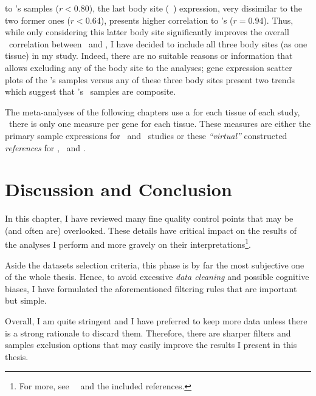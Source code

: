 \begin{itemize}[topsep=0pt,nosep]
            to \uhlen{}'s  samples ($r < 0.80$),
            the last body site (\ie\ ) expression,
            very dissimilar to the two former ones ($r < 0.64$),
            presents higher correlation to \uhlen's ($r = 0.94$).
            Thus, while only considering this latter body site significantly improves
            the overall \oesophagus\ correlation between \gtex\ and \uhlen,
            I have decided to include all three body sites (as one tissue)
            in my study.
            Indeed, there are no suitable reasons or information that allows excluding
            any of the body site  to the analyses;
            gene expression scatter plots of the \uhlen{}'s samples versus
            any of these three body sites present two trends which suggest that
            \uhlen{}'s \oesophagus\ samples are composite.

\end{itemize}

The meta-analyses of the following chapters use
a  for each tissue of each study, \ie\
there is only one measure per gene for each tissue.
These measures\label{def:trep} are either
the primary sample expressions for \castle\ and \ibm\ studies or
these \emph{\enquote{virtual}} constructed \emph{references}
for \brawand, \uhlen\ and \gtex.\mybr\



\section{Discussion and Conclusion}

In this chapter, I have reviewed many fine quality control points that
may be (and often are) overlooked.
These details have critical impact on the results of the analyses
I perform and more gravely on their interpretations\footnote{%
For more, see~~
and the included references.}.\mybr\

Aside the datasets selection criteria,
this phase is by far the most subjective one of the whole thesis.
Hence, to avoid excessive \emph{data cleaning}
and possible cognitive biases,
I have formulated the aforementioned filtering rules
that are important but simple.\mybr\

Overall, I am quite stringent and I have preferred to keep more data
unless there is a strong rationale to discard them.
Therefore, there are sharper filters and samples exclusion options that
may easily improve the results I present in this thesis.\mybr\

